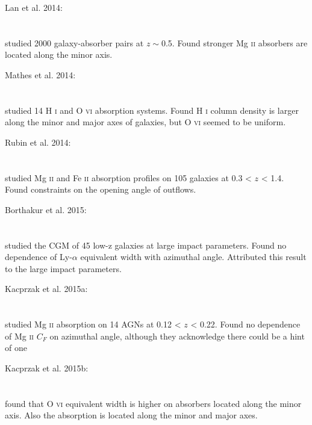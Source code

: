 \hline

Lan et al. 2014: \\
\citet{2014ApJ...795...31L} \\
\citep{2014ApJ...795...31L} \\
studied 2000 galaxy-absorber pairs at $z\sim$0.5. Found stronger
Mg \textsc{ii} absorbers are located along the minor axis. \\

\hline

Mathes et al. 2014: \\
\citet{2014ApJ...792..128M} \\
\citep{2014ApJ...792..128M} \\
studied 14 H \textsc{i} and O \textsc{vi} absorption systems. Found
H \textsc{i} column density is larger along the minor and major axes of
galaxies, but O \textsc{vi} seemed to be uniform. \\

\hline

Rubin et al. 2014: \\
\citet{2014ApJ...794..156R} \\
\citep{2014ApJ...794..156R} \\
studied Mg \textsc{ii} and Fe \textsc{ii} absorption profiles on 105 galaxies at
0.3 < $z$ < 1.4. Found constraints on the opening angle of outflows. \\

\hline

Borthakur et al. 2015: \\
\citet{2015ApJ...813...46B} \\
\citep{2015ApJ...813...46B} \\
studied the CGM of 45 low-z galaxies at large impact parameters. Found no
dependence of Ly-$\alpha$ equivalent width with azimuthal angle. Attributed
this result to the large impact parameters. \\

\hline

Kacprzak et al. 2015a: \\
\citet{2015MNRAS.446.2861K} \\
\citep{2015MNRAS.446.2861K} \\
studied Mg \textsc{ii} absorption on 14 AGNs at 0.12 < $z$ < 0.22. Found no
dependence of Mg \textsc{ii} $C_{F}$ on azimuthal angle, although they
acknowledge there could be a hint of one\\

\hline

Kacprzak et al. 2015b: \\
\citet{2015ApJ...815...22K} \\
\citep{2015ApJ...815...22K} \\
found that O \textsc{vi} equivalent width is higher on absorbers located along
the minor axis. Also the absorption is located along the minor and major axes.
\\

